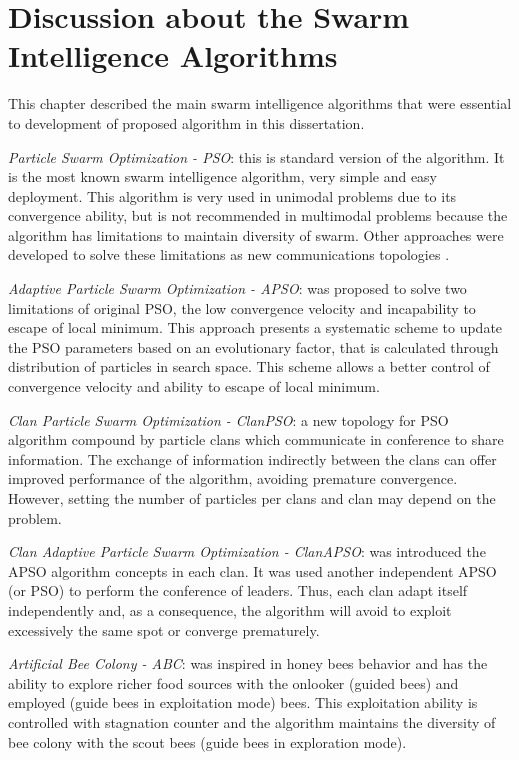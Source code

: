 \section{Discussion about the Swarm Intelligence Algorithms}
This chapter described the main swarm intelligence algorithms that were essential to development of proposed algorithm in this dissertation.

\emph{Particle Swarm Optimization - PSO}: this is standard version of the algorithm. It is the most known swarm intelligence algorithm, very simple and easy deployment. This algorithm is very used in unimodal problems due to its convergence ability, but is not recommended  in multimodal problems because the algorithm has limitations to maintain diversity of swarm. Other approaches were developed  to solve these limitations \cite{PSO:Clerc99} \cite{PSO:Clerc2002} as new communications topologies \cite{ClanPSO:Carvalho2008} \cite{ClanPSO:Carvalho2009} \cite{ClanAPSO:Pontes2011} \cite{MultiPSO:Bastos2008}.

\emph{Adaptive Particle Swarm Optimization - APSO}: was proposed to solve two limitations of original PSO, the low convergence velocity and incapability to escape of local minimum. This approach presents a systematic scheme to update the PSO parameters based on an evolutionary factor, that is calculated through distribution of particles in search space. This scheme allows a better control of convergence velocity and ability to escape of local minimum.

\emph{Clan Particle Swarm Optimization - ClanPSO}: a new topology for PSO algorithm compound by particle clans which communicate in conference to share information. The exchange of information indirectly between the clans can offer improved performance of the algorithm, avoiding premature convergence. However, setting the number of particles per clans and clan may depend on the problem.

\emph{Clan Adaptive Particle Swarm Optimization - ClanAPSO}: was introduced the APSO algorithm concepts in each clan. It was used another independent APSO (or PSO) to perform the conference of leaders.  Thus, each clan adapt itself independently and, as a consequence, the algorithm will avoid to exploit excessively the same spot or converge prematurely.

\emph{Artificial Bee Colony - ABC}: was inspired in honey bees behavior and has the ability to explore richer food sources with the onlooker (guided bees) and employed (guide bees in exploitation mode) bees. This exploitation ability is controlled with stagnation counter and the algorithm maintains the diversity of bee colony with the scout bees (guide bees in exploration mode).

